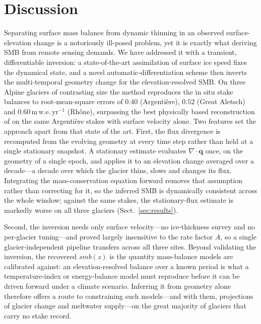 \section{Discussion}\label{sec:discussion}

Separating surface mass balance from dynamic thinning in an observed
surface-elevation change is a notoriously ill-posed problem, yet it is exactly what
deriving SMB from remote sensing demands. We have addressed it with a transient,
differentiable inversion: a state-of-the-art assimilation of surface ice speed fixes
the dynamical state, and a novel automatic-differentiation scheme then inverts the
multi-temporal geometry change for the elevation-resolved SMB. On three Alpine
glaciers of contrasting size the method reproduces the in situ stake balances to
root-mean-square errors of $0.40$ (Argentière), $0.52$ (Great Aletsch) and
$0.60\,\mathrm{m\,w.e.\,yr^{-1}}$ (Rhône), surpassing the best physically based
reconstruction of \citet{kneib2024} on the same Argentière stakes with surface
velocity alone. Two features set the approach apart from that state of the art.
First, the flux divergence is recomputed from the evolving geometry at every time step
rather than held at a single stationary snapshot. A stationary estimate evaluates
$\nabla\!\cdot\mathbf{q}$ once, on the geometry of a single epoch, and applies it to an
elevation change averaged over a decade---a decade over which the glacier thins, slows
and changes its flux. Integrating the mass-conservation equation forward removes that
assumption rather than correcting for it, so the inferred SMB is dynamically consistent
across the whole window; against the same stakes, the stationary-flux estimate is
markedly worse on all three glaciers (Sect.~\ref{sec:results}).

Second, the inversion needs only surface velocity---no
ice-thickness survey and no per-glacier tuning---and proved largely insensitive to
the rate factor $A$, so a single glacier-independent pipeline transfers across all
three sites. Beyond validating the inversion, the recovered $smb(z)$ is the quantity
mass-balance models are calibrated against: an elevation-resolved balance over a known
period is what a temperature-index or energy-balance model must reproduce before it can
be driven forward under a climate scenario. Inferring it from geometry alone therefore
offers a route to constraining such models---and with them, projections of glacier
change and meltwater supply---on the great majority of glaciers that carry no stake
record.

